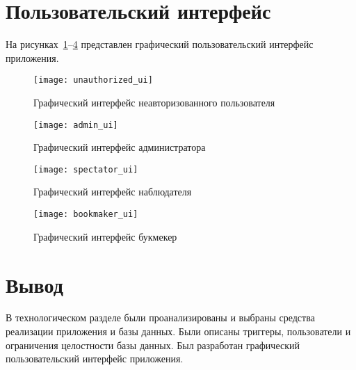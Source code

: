 \section{Пользовательский интерфейс}

На рисунках~\ref{unauthorized_ui}--\ref{bookmaker_ui} представлен графический пользовательский интерфейс приложения.
\begin{figure}[H]
	\centering
	\texttt{[image: unauthorized\_ui]}
	\caption{Графический интерфейс неавторизованного пользователя}
	\label{unauthorized_ui}
\end{figure}
\begin{figure}[H]
	\centering
	\texttt{[image: admin\_ui]}
	\caption{Графический интерфейс администратора}
	\label{admin_ui}
\end{figure}
\begin{figure}[H]
	\centering
	\texttt{[image: spectator\_ui]}
	\caption{Графический интерфейс наблюдателя}
	\label{spectator_ui}
\end{figure}
\begin{figure}[H]
	\centering
	\texttt{[image: bookmaker\_ui]}
	\caption{Графический интерфейс букмекер}
	\label{bookmaker_ui}
\end{figure}

\section*{Вывод}

В технологическом разделе были проанализированы и выбраны средства реализации приложения и базы данных. Были описаны триггеры, пользователи и ограничения целостности базы данных. Был разработан графический пользовательский интерфейс приложения.

\clearpage
